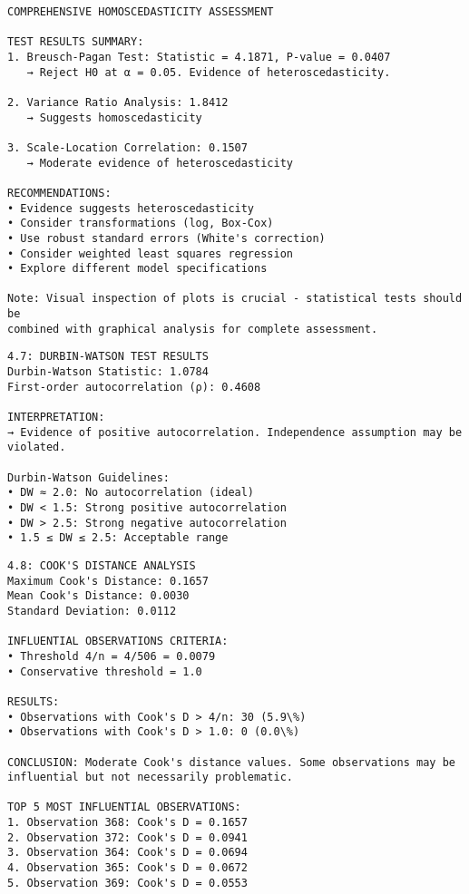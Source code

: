 \documentclass[8pt, twocolumn]{extarticle}
\begin{document}
    \begin{Verbatim}[commandchars=\\\{\}]
COMPREHENSIVE HOMOSCEDASTICITY ASSESSMENT

TEST RESULTS SUMMARY:
1. Breusch-Pagan Test: Statistic = 4.1871, P-value = 0.0407
   → Reject H0 at α = 0.05. Evidence of heteroscedasticity.

2. Variance Ratio Analysis: 1.8412
   → Suggests homoscedasticity

3. Scale-Location Correlation: 0.1507
   → Moderate evidence of heteroscedasticity

RECOMMENDATIONS:
• Evidence suggests heteroscedasticity
• Consider transformations (log, Box-Cox)
• Use robust standard errors (White's correction)
• Consider weighted least squares regression
• Explore different model specifications

Note: Visual inspection of plots is crucial - statistical tests should be
combined with graphical analysis for complete assessment.
    \end{Verbatim}

    \begin{Verbatim}[commandchars=\\\{\}]
4.7: DURBIN-WATSON TEST RESULTS
Durbin-Watson Statistic: 1.0784
First-order autocorrelation (ρ): 0.4608

INTERPRETATION:
→ Evidence of positive autocorrelation. Independence assumption may be violated.

Durbin-Watson Guidelines:
• DW ≈ 2.0: No autocorrelation (ideal)
• DW < 1.5: Strong positive autocorrelation
• DW > 2.5: Strong negative autocorrelation
• 1.5 ≤ DW ≤ 2.5: Acceptable range

    \end{Verbatim}

    \begin{Verbatim}[commandchars=\\\{\}]
4.8: COOK'S DISTANCE ANALYSIS
Maximum Cook's Distance: 0.1657
Mean Cook's Distance: 0.0030
Standard Deviation: 0.0112

INFLUENTIAL OBSERVATIONS CRITERIA:
• Threshold 4/n = 4/506 = 0.0079
• Conservative threshold = 1.0

RESULTS:
• Observations with Cook's D > 4/n: 30 (5.9\%)
• Observations with Cook's D > 1.0: 0 (0.0\%)

CONCLUSION: Moderate Cook's distance values. Some observations may be
influential but not necessarily problematic.

TOP 5 MOST INFLUENTIAL OBSERVATIONS:
1. Observation 368: Cook's D = 0.1657
2. Observation 372: Cook's D = 0.0941
3. Observation 364: Cook's D = 0.0694
4. Observation 365: Cook's D = 0.0672
5. Observation 369: Cook's D = 0.0553

    \end{Verbatim}
\end{document}
